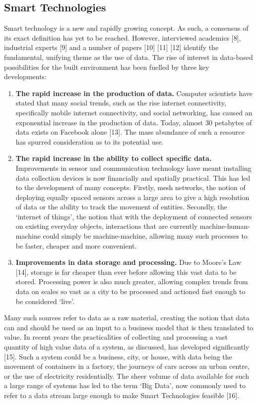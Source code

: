 \documentclass[conference]{IEEEtran}
\begin{document}
\subsection{Smart Technologies}

Smart technology is a new and rapidly growing concept. As such, a
consensus of its exact definition has yet to be reached. However,
interviewed academics [8], industrial experts [9] and a number of
papers [10] [11] [12] identify the fundamental, unifying theme as the
use of data. The rise of interest in data-based possibilities for the
built environment has been fuelled by three key developments:

\begin{enumerate}
\item {\textbf{The rapid increase in the production of data.}}
  Computer scientists have stated that many social trends, such as the
  rise internet connectivity, specifically mobile internet
  connectivity, and social networking, has caused an exponential
  increase in the production of data. Today, almost 30 petabytes of
  data exists on Facebook alone [13]. The mass abundance of such a
  resource has spurred consideration as to its potential use.
\item {\textbf{The rapid increase in the ability to collect specific
      data.}} Improvements in sensor and communication technology have
  meant installing data collection devices is now financially and
  spatially practical. This has led to the development of many
  concepts. Firstly, mesh networks, the notion of deploying equally
  spaced sensors across a large area to give a high resolution of data
  or the ability to track the movement of entities. Secondly, the
  ‘internet of things’, the notion that with the deployment of
  connected sensors on existing everyday objects, interactions that
  are currently machine-human-machine could simply be machine-machine,
  allowing many such processes to be faster, cheaper and  more
  convenient. 
\item {\textbf{Improvements in data storage and processing.}} Due to
  Moore’s Law [14], storage is far cheaper than ever before allowing
  this vast data to be stored. Processing power is also much greater,
  allowing complex trends from data on scales so vast as a city to be
  processed and actioned fast enough to be considered ‘live’.
\end{enumerate}

Many such sources refer to data as a raw material, creating the notion
that data can and should be used as an input to a business model that
is then translated to value. In recent years the practicalities of
collecting and processing a vast quantity of high value data of a
system, as discussed, has developed significantly [15]. Such a system
could be a business, city, or house, with data being the movement of
containers in a factory, the journeys of cars across an urban centre,
or the use of electricity residentially. The sheer volume of data
available for such a large range of systems has led to the term ‘Big
Data’, now commonly used to refer to a data stream large enough to
make Smart Technologies feasible [16].
\end{document}
